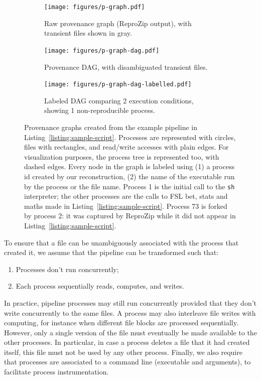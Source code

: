 \documentclass[a4paper,num-refs]{oup-contemporary}
\newcommand{\reprozip}[0]{ReproZip\xspace}
\begin{document}
\begin{figure}
  \begin{subfigure}[t]{0.3\linewidth}
    \centering
    \texttt{[image: figures/p-graph.pdf]}
    \caption{Raw provenance graph (\reprozip output), with transient files shown in gray.}
    \label{fig:provenance-graph}
  \end{subfigure}
  \hfill
  \begin{subfigure}[t]{0.3\linewidth}
    \centering
    \texttt{[image: figures/p-graph-dag.pdf]}
    \caption{Provenance DAG, with disambiguated transient files.}
    \label{fig:provenance-dag}
  \end{subfigure}
  \hfill
  \begin{subfigure}[t]{0.3\linewidth}
      \centering
      \texttt{[image: figures/p-graph-dag-labelled.pdf]}
     \caption{Labeled DAG comparing 2 execution conditions, showing 1 non-reproducible process.}
     \label{fig:labeled-dag} 
  \end{subfigure}
    \caption{Provenance graphs
    created from the example pipeline in
    Listing~\ref{listing:sample-script}.
    Processes are represented with circles, files with rectangles, and read/write accesses 
    with plain edges. 
    For visualization purposes, the process tree is represented too, with
    dashed edges. Every node in the graph is labeled using (1) a process id
    created by our reconstruction, (2) the name of the executable run by the
    process or the file name. Process 1 is the initial call to the
    \texttt{sh} interpreter; the other processes are the calls to FSL bet,
    stats and maths made in Listing~\ref{listing:sample-script}. Process 73
    is forked by process 2: it was captured by \reprozip while it did not
    appear in Listing~\ref{listing:sample-script}.
  }
    \label{fig:spot-example}
  \end{figure}

To ensure that a file can be unambiguously associated with the process that
created it, we assume that the pipeline can be transformed such that:
\begin{enumerate}
\item Processes don't run concurrently;
\item Each process sequentially reads, computes, and writes. 
\end{enumerate}
In practice, pipeline processes may still run concurrently provided that
they don't write concurrently to the same files. A process may also
interleave file writes with computing, for instance when different file
blocks are processed sequentially. However, only a single version of the
file must eventually be made available to the other processes. In
particular, in case a process deletes a file that it had created itself,
this file must not be used by any other process. Finally, we also require that processes are
associated to a command line (executable and arguments), to facilitate
process instrumentation.
\end{document}
